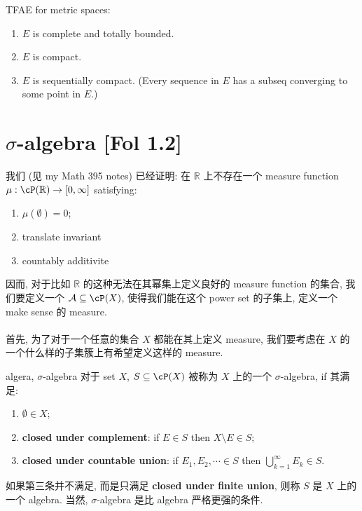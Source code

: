 \documentclass[lang=cn,11pt]{elegantbook}
\begin{document}
\begin{theorem}
    TFAE for metric spaces:
    \begin{enumerate}
        \item $E$ is complete and totally bounded.
        \item $E$ is compact.
        \item $E$ is sequentially compact. (Every sequence in $E$ has a subseq converging to some point in $E$.)
    \end{enumerate}
\end{theorem}


\chapter{$\sigma$-algebra [Fol 1.2]}
\noindent 我们 (见 my Math 395 notes) 已经证明: 在 $\mathbb{R}$ 上不存在一个 measure function $\mu : \cP(\mathbb{R}) \rar [0,\infty]$ satisfying:
\begin{enumerate}
    \item $\mu(\emptyset) = 0$;
    \item translate invariant
    \item countably additivite
\end{enumerate}

\noindent 因而, 对于比如 $\mathbb{R}$ 的这种无法在其幂集上定义良好的 measure function 的集合, 我们要定义一个 $\mathcal{A} \sub \cP(X)$, 使得我们能在这个 power set 的子集上, 定义一个 make sense 的 measure.\\\\
\noindent 
首先, 为了对于一个任意的集合 $X$ 都能在其上定义 measure, 我们要考虑在 $X$ 的一个什么样的子集簇上有希望定义这样的 measure. 

\begin{definition}{algera, $\sigma$-algebra}
对于 set $X$, $S \sub \cP(X)$ 被称为 $X$ 上的一个 $\sigma$-algebra, if 其满足:
\begin{enumerate}
    \item $\emptyset \in X$;
    \item \textbf{closed under complement}: if $E \in S$ then $X \setminus E \in S$;
    \item \textbf{closed under countable union}: if $E_1,E_2,\cdots \in S$ then $\bigcup_{k=1}^\infty E_k \in S$.
\end{enumerate}
如果第三条并不满足, 而是只满足 \textbf{closed under finite union}, 则称 $S$ 是 $X$ 上的一个 algebra. 当然, $\sigma$-algebra 是比 algebra 严格更强的条件.
\end{definition}
\end{document}
